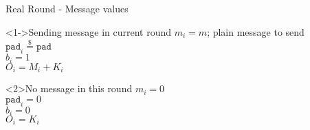 \begin{frame}{Real Round - Message values}
    \begin{block}<1->{Sending message in current round}
    $m_i = m$; plain message to send\\
    $\texttt{pad}_i \stackrel{\$}{=} \texttt{pad}$\\
    $b_i = 1$\\
    $O_i = M_i + K_i$
    \end{block}
    \begin{block}<2>{No message in this round}
    $m_i = 0$\\
    $\texttt{pad}_i = 0$\\
    $b_i = 0$\\
    $O_i = K_i$
    \end{block}
\end{frame}